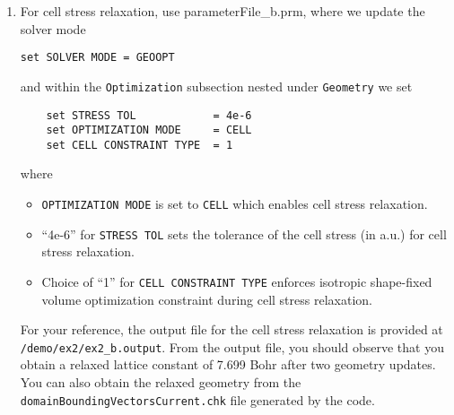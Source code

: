 \begin{enumerate}
\item For cell stress relaxation, use parameterFile\_b.prm, where we update the solver mode
\begin{verbatim}
set SOLVER MODE = GEOOPT
\end{verbatim}
and within the \verb|Optimization| subsection nested under \verb|Geometry| we set
\begin{verbatim}
    set STRESS TOL            = 4e-6
    set OPTIMIZATION MODE     = CELL
    set CELL CONSTRAINT TYPE  = 1
\end{verbatim}
where
\begin{itemize}
\item \verb|OPTIMIZATION MODE| is set to \verb|CELL| which enables cell stress relaxation.  		
\item ``4e-6'' for \verb|STRESS TOL| sets the tolerance of the cell stress (in a.u.) for cell stress relaxation.
\item Choice of ``1'' for \verb|CELL CONSTRAINT TYPE| enforces isotropic shape-fixed volume optimization constraint during cell stress relaxation.
\end{itemize}
For your reference, the output file for the cell stress relaxation is provided at \verb|/demo/ex2/ex2_b.output|. From the output file, you should observe that you obtain a relaxed lattice constant of 7.699 Bohr after two geometry updates. You can also obtain the relaxed geometry from the \verb|domainBoundingVectorsCurrent.chk| file generated by the code.
\end{enumerate}

